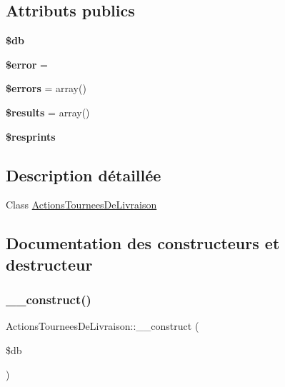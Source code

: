 \subsection*{Attributs publics}
\begin{DoxyCompactItemize}
\item 
\mbox{\label{classActionsTourneesDeLivraison_a451c869d411a8422b40d12f6c091d5fb}} 
{\bfseries \$db}
\item 
\mbox{\label{classActionsTourneesDeLivraison_a88aa7f29a313e0efaa0b99e4ba9fe155}} 
{\bfseries \$error} = \textquotesingle{}\textquotesingle{}
\item 
\mbox{\label{classActionsTourneesDeLivraison_abeb84774296cdf348c7834de92a78704}} 
{\bfseries \$errors} = array()
\item 
\mbox{\label{classActionsTourneesDeLivraison_aee8b509cb00d374de9d56dd38b0f3714}} 
{\bfseries \$results} = array()
\item 
\mbox{\label{classActionsTourneesDeLivraison_a3a252a54a5da39c7286611e0f8abbf8c}} 
{\bfseries \$resprints}
\end{DoxyCompactItemize}


\subsection{Description détaillée}
Class \hyperlink{classActionsTourneesDeLivraison}{Actions\+Tournees\+De\+Livraison} 

\subsection{Documentation des constructeurs et destructeur}
\mbox{\label{classActionsTourneesDeLivraison_a5fbe4d847f23e5d9f235c0bbae53c3a8}} 
\subsubsection{\texorpdfstring{\+\_\+\+\_\+construct()}{\_\_construct()}}
{\footnotesize\ttfamily Actions\+Tournees\+De\+Livraison\+::\+\_\+\+\_\+construct (\begin{DoxyParamCaption}\item[{}]{\$db }\end{DoxyParamCaption})}

